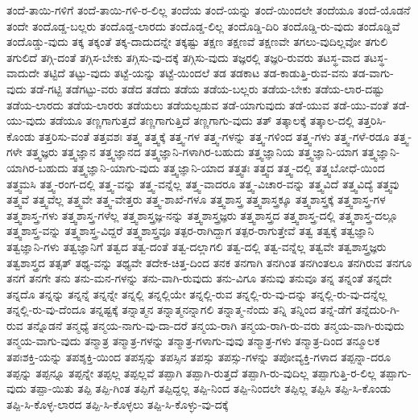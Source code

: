 {ತಂದೆ-ತಾಯಿ-ಗಳಿಗೆ
ತಂದೆ-ತಾಯಿ-ಗಳಿ-ರ-ಲಿಲ್ಲ
ತಂದೆಯ
ತಂದೆ-ಯನ್ನು
ತಂದೆ-ಯಿಂದಲೇ
ತಂದೆಯೂ
ತಂದೆ-ಯೊಡನೆ
ತಂದೇ
ತಂದೊಡ್ಡ-ಬಲ್ಲರು
ತಂದೊಡ್ಡ-ಲಾರದು
ತಂದೊಡ್ಡ-ಲಿಲ್ಲ
ತಂದೊಡ್ಡಿ-ದಿರಿ
ತಂದೊಡ್ಡಿ-ರು-ವುದು
ತಂದೊಡ್ಡಿವೆ
ತಂದೊಡ್ಡು-ವುದು
ತಕ್ಕ
ತಕ್ಕಂತೆ
ತಕ್ಕ-ದಾದುದನ್ನೇ
ತಕ್ಕಷ್ಟು
ತಕ್ಷಣ
ತಕ್ಷಣವೆ
ತಕ್ಷಣವೇ
ತಗಲು-ವುದಿಲ್ಲವೋ
ತಗುಲಿ
ತಗುಲಿದೆ
ತಗ್ಗಿ-ದಂತೆ
ತಗ್ಗಿಸ-ಬೇಕು
ತಗ್ಗಿಸು-ವು-ದಕ್ಕೆ
ತಗ್ಗಿಸು-ವುದು
ತಜ್ಞರಲ್ಲಿ
ತಜ್ಞರಿ-ರುವರು
ತಟಸ್ಥ-ವಾದ
ತಟಸ್ಥ-ವಾದುದೇ
ತಟ್ಟಿದೆ
ತಟ್ಟು-ವುದು
ತಟ್ಟೆ-ಯನ್ನು
ತಟ್ಟೆ-ಯಿಂದಲೆ
ತಡ
ತಡಕಾಟ
ತಡ-ಕಾಡುತ್ತಿ-ರುವ-ವನು
ತಡ-ವಾಗು-ವುದು
ತಡೆ-ಗಟ್ಟಿ
ತಡೆಗಟ್ಟು-ವರು
ತಡೆದ
ತಡೆದು
ತಡೆಯ
ತಡೆಯ-ಬಲ್ಲರು
ತಡೆಯ-ಬೇಕು
ತಡೆಯ-ಲಾರ-ದಷ್ಟು
ತಡೆಯ-ಲಾರದು
ತಡೆಯ-ಲಾರರು
ತಡೆಯಲು
ತಡೆಯಲ್ಪಡುವ
ತಡೆ-ಯಾಗುವುದು
ತಡೆ-ಯುವ
ತಡೆ-ಯು-ವಂತೆ
ತಡೆ-ಯು-ವುದು
ತಡೆಯೂ
ತಣ್ಣಗಾಗುತ್ತದೆ
ತಣ್ಣಗಾಗುತ್ತಿದೆ
ತಣ್ಣಗಾಗು-ವುದು
ತತ್
ತತ್ಕಾಲಕ್ಕೆ
ತತ್ಕಾಲ-ದಲ್ಲಿ
ತತ್ತರಿಸಿ-ಕೊಂಡು
ತತ್ತರಿಸು-ವಂತೆ
ತತ್ತವಶಃ
ತತ್ತ್ವ
ತತ್ತ್ವಕ್ಕೆ
ತತ್ತ್ವ-ಗಳ
ತತ್ತ್ವ-ಗಳನ್ನು
ತತ್ತ್ವ-ಗಳಿಂದ
ತತ್ತ್ವ-ಗಳು
ತತ್ತ್ವ-ಗಳೆ-ರಡೂ
ತತ್ತ್ವ-ಗಳೇ
ತತ್ತ್ವಜ್ಞರು
ತತ್ತ್ವಜ್ಞಾನ
ತತ್ತ್ವಜ್ಞಾನದ
ತತ್ತ್ವಜ್ಞಾನಿ-ಗಳಾಗಿರ-ಬಹುದು
ತತ್ತ್ವಜ್ಞಾನಿಯ
ತತ್ತ್ವಜ್ಞಾನಿ-ಯಾಗ
ತತ್ತ್ವಜ್ಞಾನಿ-ಯಾಗಿರ-ಬಹುದು
ತತ್ತ್ವಜ್ಞಾನಿ-ಯಾಗು-ವುದು
ತತ್ತ್ವಜ್ಞಾನಿ-ಯಾದ
ತತ್ತ್ವತಃ
ತತ್ತ್ವದ
ತತ್ತ್ವ-ದಲ್ಲಿ
ತತ್ತ್ವಬೋಧೆ-ಯಿಂದ
ತತ್ತ್ವಮಸಿ
ತತ್ತ್ವ-ರಂಗ-ದಲ್ಲಿ
ತತ್ತ್ವ-ವನ್ನು
ತತ್ತ್ವ-ವನ್ನೆಲ್ಲ
ತತ್ತ್ವ-ವಾದರೂ
ತತ್ತ್ವ-ವಿಚಾರ-ವನ್ನು
ತತ್ತ್ವವಿದೆ
ತತ್ತ್ವವಿದ್ಯೆ
ತತ್ತ್ವವು
ತತ್ತ್ವವೆ
ತತ್ತ್ವವೆಲ್ಲ
ತತ್ತ್ವವೇ
ತತ್ತ್ವ-ವೇತ್ತರು
ತತ್ತ್ವ-ಶಾಖೆ-ಗಳೂ
ತತ್ತ್ವಶಾಸ್ತ್ರ
ತತ್ತ್ವಶಾಸ್ತ್ರಕ್ಕೂ
ತತ್ತ್ವಶಾಸ್ತ್ರಕ್ಕೆ
ತತ್ತ್ವಶಾಸ್ತ್ರ-ಗಳ
ತತ್ತ್ವಶಾಸ್ತ್ರ-ಗಳು
ತತ್ತ್ವಶಾಸ್ತ್ರ-ಗಳೆಲ್ಲ
ತತ್ತ್ವಶಾಸ್ತ್ರಜ್ಞ-ನನ್ನು
ತತ್ತ್ವಶಾಸ್ತ್ರಜ್ಞರು
ತತ್ತ್ವಶಾಸ್ತ್ರದ
ತತ್ತ್ವಶಾಸ್ತ್ರ-ದಲ್ಲಿ
ತತ್ತ್ವಶಾಸ್ತ್ರ-ದಲ್ಲೂ
ತತ್ತ್ವಶಾಸ್ತ್ರ-ವನ್ನು
ತತ್ತ್ವಶಾಸ್ತ್ರ-ವಿದ್ದರೆ
ತತ್ತ್ವಶಾಸ್ತ್ರವೂ
ತತ್ಪರ-ರಾಗಿದ್ದಾಗ
ತತ್ಪರ-ರಾಗುತ್ತೇವೆ
ತತ್ವ
ತತ್ವಕ್ಕೆ
ತತ್ವಜ್ಞಾನಿ
ತತ್ವಜ್ಞಾನಿ-ಗಳು
ತತ್ವಜ್ಞಾನಿಗೆ
ತತ್ವದ
ತತ್ವ-ದಂತೆ
ತತ್ವ-ದಲ್ಲಾಗಲಿ
ತತ್ವ-ದಲ್ಲಿ
ತತ್ವ-ವನ್ನೆಲ್ಲ
ತತ್ವವೇ
ತತ್ವಶಾಸ್ತ್ರಜ್ಞರು
ತತ್ವಶಾಸ್ತ್ರದ
ತತ್ಸತ್
ತಥ್ಯ-ವನ್ನು
ತಥ್ಯವೇ
ತದೇಕ-ಚಿತ್ತ-ದಿಂದ
ತನಕ
ತನಗಾಗಿ
ತನಗಿಂತ
ತನಗಿಂತಲೂ
ತನಗಿರುವ
ತನಗೂ
ತನಗೆ
ತನಗೇ
ತನು
ತನು-ಮನ-ಗಳನ್ನು
ತನು-ವಾಗಿ-ರುವುದು
ತನು-ವಿಗೂ
ತನುವು
ತನುವೂ
ತನ್ನ
ತನ್ನಂತೆ
ತನ್ನದೇ
ತನ್ನದೊ
ತನ್ನನ್ನು
ತನ್ನನ್ನೆ
ತನ್ನನ್ನೇ
ತನ್ನಲ್ಲಿ
ತನ್ನಲ್ಲಿಯೇ
ತನ್ನಲ್ಲಿ-ರುವ
ತನ್ನಲ್ಲಿ-ರು-ವು-ದನ್ನು
ತನ್ನಲ್ಲಿ-ರು-ವು-ದನ್ನೆಲ್ಲ
ತನ್ನಲ್ಲಿ-ರು-ವು-ದೆಂದೂ
ತನ್ನಷ್ಟಕ್ಕೆ
ತನ್ನಾತ್ಮನ
ತನ್ನಾತ್ಮನನ್ನಾಗಲಿ
ತನ್ನಾತ್ಮ-ನೆಂದು
ತನ್ನಿ
ತನ್ನಿಂದ
ತನ್ನೆ-ಡೆಗೆ
ತನ್ನೆದುರಿ-ಗಿ-ರುವ
ತನ್ನೊಡನೆ
ತನ್ಮಧ್ಯೆ
ತನ್ಮಯ-ನಾಗು-ವು-ದಾ-ದರೆ
ತನ್ಮಯ-ರಾಗಿ
ತನ್ಮಯ-ರಾಗಿ-ರು-ವರು
ತನ್ಮಯ-ವಾಗಿ-ರುವುದು
ತನ್ಮಯ-ವಾಗು-ವುದು
ತನ್ಮಾತ್ರ
ತನ್ಮಾತ್ರ-ಗಳನ್ನು
ತನ್ಮಾತ್ರ-ಗಳಾಗು-ವುವು
ತನ್ಮಾತ್ರ-ಗಳು
ತನ್ಮಾತ್ರ-ದಿಂದ
ತನ್ಮೂಲಕ
ತಪಃಶಕ್ತಿ-ಯನ್ನು
ತಪಶ್ಶಕ್ತಿ-ಯಿಂದ
ತಪಸ್ಸನ್ನು
ತಪಸ್ಸಿನ
ತಪಸ್ಸು
ತಪಸ್ಸು-ಗಳನ್ನು
ತಪೋವ್ಯಕ್ತಿ-ಗಳಾದ
ತಪ್ಪನ್ನಾ-ದರೂ
ತಪ್ಪನ್ನು
ತಪ್ಪನ್ನೂ
ತಪ್ಪನ್ನೇ
ತಪ್ಪಲ್ಲ
ತಪ್ಪಲ್ಲವೆ
ತಪ್ಪಾಗಿ
ತಪ್ಪಾಗಿ-ರುತ್ತದೆ
ತಪ್ಪಾಗಿ-ರು-ವುದಿಲ್ಲ
ತಪ್ಪಾಗುತ್ತಿ-ರ-ಲಿಲ್ಲ
ತಪ್ಪಾಗು-ವುದು
ತಪ್ಪಾ-ಯಿತು
ತಪ್ಪಿ
ತಪ್ಪಿ-ಗಿಂತ
ತಪ್ಪಿಗೆ
ತಪ್ಪಿದ್ದಲ್ಲ
ತಪ್ಪಿ-ನಿಂದ
ತಪ್ಪಿ-ನಿಂದಲೇ
ತಪ್ಪಿಲ್ಲ
ತಪ್ಪಿಸಿ
ತಪ್ಪಿ-ಸಿ-ಕೊಂಡು
ತಪ್ಪಿ-ಸಿ-ಕೊಳ್ಳ-ಲಾರದ
ತಪ್ಪಿ-ಸಿ-ಕೊಳ್ಳಲು
ತಪ್ಪಿ-ಸಿ-ಕೊಳ್ಳು-ವು-ದಕ್ಕೆ
}
